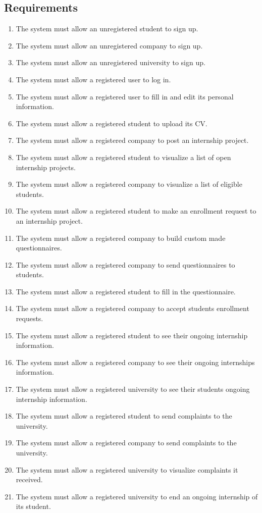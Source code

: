 \subsection{Requirements}

\begin{enumerate}[label=\textbf{R\arabic* -}]
    \item The system must allow an unregistered student to sign up.
    \item The system must allow an unregistered company to sign up.
    \item The system must allow an unregistered university to sign up.
    \item The system must allow a registered user to log in.
    \item The system must allow a registered user to fill in and edit its personal information.
    \item The system must allow a registered student to upload its CV.
    \item The system must allow a registered company to post an internship project.
    \item The system must allow a registered student to visualize a list of open internship projects.
    \item The system must allow a registered company to visualize a list of eligible students.
    \item The system must allow a registered student to make an enrollment request to an internship project.
    \item The system must allow a registered company to build custom made questionnaires.
    \item The system must allow a registered company to send questionnaires to students.
    \item The system must allow a registered student to fill in the questionnaire.
    \item The system must allow a registered company to accept students enrollment requests.
    \item The system must allow a registered student to see their ongoing internship information.
    \item The system must allow a registered company to see their ongoing internships information.
    \item The system must allow a registered university to see their students ongoing internship information.
    \item The system must allow a registered student to send complaints to the university.
    \item The system must allow a registered company to send complaints to the university.
    \item The system must allow a registered university to visualize complaints it received.
    \item The system must allow a registered university to end an ongoing internship of its student.
\end{enumerate}

